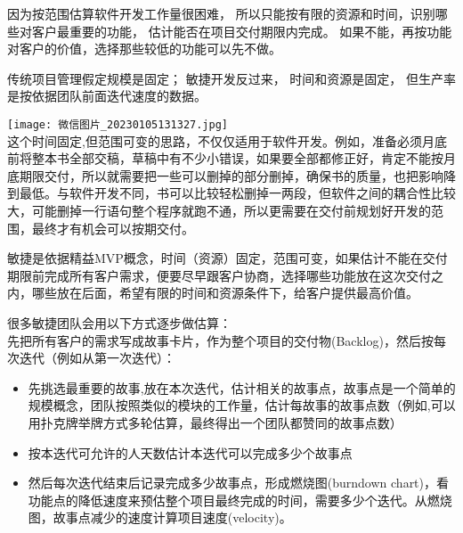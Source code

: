因为按范围估算软件开发工作量很困难，
所以只能按有限的资源和时间，识别哪些对客户最重要的功能，
估计能否在项目交付期限内完成。
如果不能，再按功能对客户的价值，选择那些较低的功能可以先不做。

传统项目管理假定规模是固定； 敏捷开发反过来， 时间和资源是固定，
但生产率是按依据团队前面迭代速度的数据。


\texttt{[image: 微信图片\_20230105131327.jpg]}\\

这个时间固定,但范围可变的思路，不仅仅适用于软件开发。例如，准备必须月底前将整本书全部交稿，草稿中有不少小错误，如果要全部都修正好，肯定不能按月底期限交付，所以就需要把一些可以删掉的部分删掉，确保书的质量，也把影响降到最低。与软件开发不同，书可以比较轻松删掉一两段，但软件之间的耦合性比较大，可能删掉一行语句整个程序就跑不通，所以更需要在交付前规划好开发的范围，最终才有机会可以按期交付。

敏捷是依据精益MVP概念，时间（资源）固定，范围可变，如果估计不能在交付期限前完成所有客户需求，便要尽早跟客户协商，选择哪些功能放在这次交付之内，哪些放在后面，希望有限的时间和资源条件下，给客户提供最高价值。

很多敏捷团队会用以下方式逐步做估算：\\
先把所有客户的需求写成故事卡片，作为整个项目的交付物(Backlog)，然后按每次迭代（例如从第一次迭代）：

\begin{itemize}
\tightlist
\item
  先挑选最重要的故事,放在本次迭代，估计相关的故事点，故事点是一个简单的规模概念，团队按照类似的模块的工作量，估计每故事的故事点数（例如,可以用扑克牌举牌方式多轮估算，最终得出一个团队都赞同的故事点数）
\item
  按本迭代可允许的人天数估计本迭代可以完成多少个故事点
\item
  然后每次迭代结束后记录完成多少故事点，形成燃烧图(burndown
  chart)，看功能点的降低速度来预估整个项目最终完成的时间，需要多少个迭代。从燃烧图，故事点减少的速度计算项目速度(velocity)。
\end{itemize}

\begin{description}
\item[]
\begin{description}
\tightlist
\item[]
+ + +
\end{description}
\end{description}

